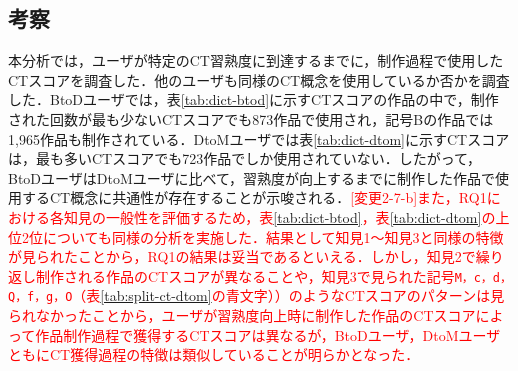 \documentclass[submit]{ipsj}
\begin{document}
\vspace{-2mm}
\subsection{考察}
本分析では，ユーザが特定のCT習熟度に到達するまでに，制作過程で使用したCTスコアを調査した．他のユーザも同様のCT概念を使用しているか否かを調査した．BtoDユーザでは，表\ref{tab:dict-btod}に示すCTスコアの作品の中で，制作された回数が最も少ないCTスコアでも873作品で使用され，記号Bの作品では1,965作品も制作されている．DtoMユーザでは表\ref{tab:dict-dtom}に示すCTスコアは，最も多いCTスコアでも723作品でしか使用されていない．したがって，BtoDユーザはDtoMユーザに比べて，習熟度が向上するまでに制作した作品で使用するCT概念に共通性が存在することが示唆される．\textcolor{red}{[変更2-7-b]また，RQ1における各知見の一般性を評価するため，表\ref{tab:dict-btod}，表\ref{tab:dict-dtom}の上位2位についても同様の分析を実施した．結果として知見1〜知見3と同様の特徴が見られたことから，RQ1の結果は妥当であるといえる．しかし，知見2で繰り返し制作される作品のCTスコアが異なることや，知見3で見られた記号\texttt{\large{M，c，d，Q，f，g，O}}（表\ref{tab:split-ct-dtom}の青文字））のようなCTスコアのパターンは見られなかったことから，ユーザが習熟度向上時に制作した作品のCTスコアによって作品制作過程で獲得するCTスコアは異なるが，BtoDユーザ，DtoMユーザともにCT獲得過程の特徴は類似していることが明らかとなった．}




\end{document}

